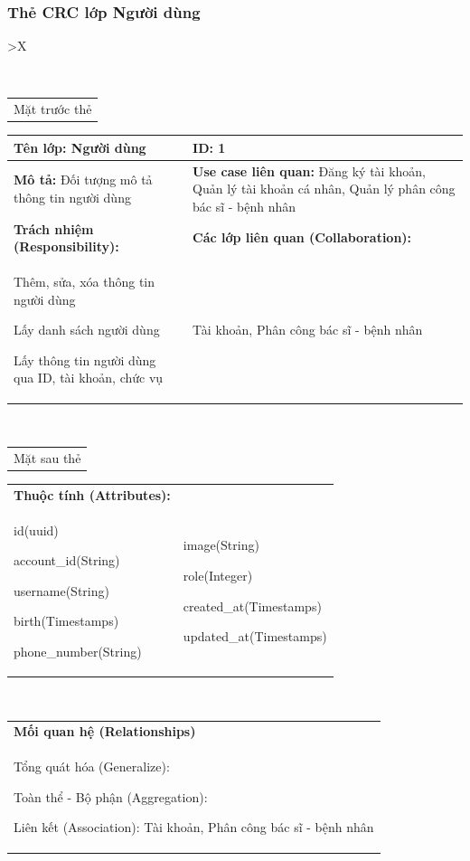 \subsubsection{Thẻ CRC lớp Người dùng}
\begin{xltabular}{\textwidth}{
   >{\centering\arraybackslash}X 
  }
  \caption{\bfseries \fontsize{12pt}{0pt}\selectfont Thẻ CRC lớp Người dùng}
  \\
  \begin{tabularx}{0.9\textwidth}{X}
    Mặt trước thẻ
  \end{tabularx}
  \begin{tabularx}{0.9\textwidth}{|X|X|}
    \hline
    \textbf{Tên lớp:} Người dùng & \textbf{ID:} 1 \\
    \hline
    \textbf{Mô tả:} Đối tượng mô tả thông tin người dùng & \textbf{Use case liên quan:}  Đăng ký tài khoản, Quản lý tài khoản cá nhân, Quản lý phân công bác sĩ - bệnh nhân\\
    \hline
    \textbf{Trách nhiệm (Responsibility):} & \textbf{Các lớp liên quan (Collaboration):} \\
    Thêm, sửa, xóa thông tin người dùng 

    Lấy danh sách người dùng

    Lấy thông tin người dùng qua ID, tài khoản, chức vụ
    & 
    Tài khoản, Phân công bác sĩ - bệnh nhân
    \\
    \hline
  \end{tabularx}
  \\ 
  \begin{tabularx}{0.9\textwidth}{X}
    Mặt sau thẻ
  \end{tabularx} 
  \begin{tabularx}{0.9\textwidth}{|X|X|}
    \hline
    \textbf{Thuộc tính (Attributes):} & \\
    id(uuid) 
    
    account\_id(String)

    username(String)

    birth(Timestamps)

    phone\_number(String)
    & 
    image(String) 
    
    role(Integer) 
    
    created\_at(Timestamps)

    updated\_at(Timestamps)
    \\ \hline
  \end{tabularx}
  \\     
  \begin{tabularx}{0.9\textwidth}{|X|}
    \hline
    \textbf{Mối quan hệ (Relationships)} \\
    Tổng quát hóa (Generalize):  

    Toàn thể - Bộ phận (Aggregation):
    
    Liên kết (Association): Tài khoản, Phân công bác sĩ - bệnh nhân 
    \\
    \hline
  \end{tabularx}
  \end{xltabular}

